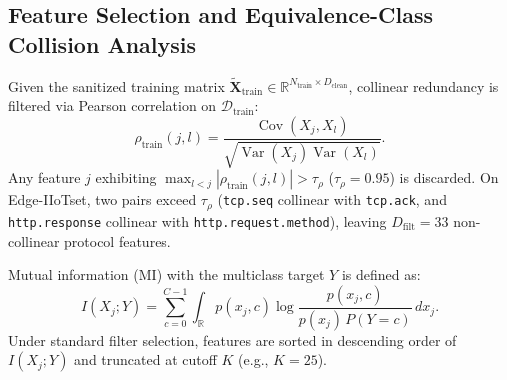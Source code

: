 \documentclass[10pt,journal,twocolumn]{IEEEtran}
\begin{document}
\subsection{Feature Selection and Equivalence-Class Collision Analysis}
Given the sanitized training matrix $\tilde{\mathbf{X}}_{\text{train}} \in \mathbb{R}^{N_{\text{train}} \times D_{\text{clean}}}$, collinear redundancy is filtered via Pearson correlation on $\mathcal{D}_{\text{train}}$:
\begin{equation}
\rho_{\text{train}}(j, l) = \frac{\operatorname{Cov}(X_j, X_l)}{\sqrt{\operatorname{Var}(X_j)\operatorname{Var}(X_l)}}.
\end{equation}
Any feature $j$ exhibiting $\max_{l < j} |\rho_{\text{train}}(j, l)| > \tau_{\rho}$ ($\tau_{\rho} = 0.95$) is discarded. On Edge-IIoTset, two pairs exceed $\tau_{\rho}$ (\texttt{tcp.seq} collinear with \texttt{tcp.ack}, and \texttt{http.response} collinear with \texttt{http.request.method}), leaving $D_{\text{filt}} = 33$ non-collinear protocol features.

Mutual information (MI) with the multiclass target $Y$ is defined as:
\begin{equation}
I(X_j; Y) = \sum_{c=0}^{C-1} \int_{\mathbb{R}} p(x_j, c) \log \frac{p(x_j, c)}{p(x_j)\,P(Y=c)}\,dx_j.
\label{eq:mi_integral}
\end{equation}
Under standard filter selection, features are sorted in descending order of $I(X_j; Y)$ and truncated at cutoff $K$ (e.g., $K=25$).
\end{document}
